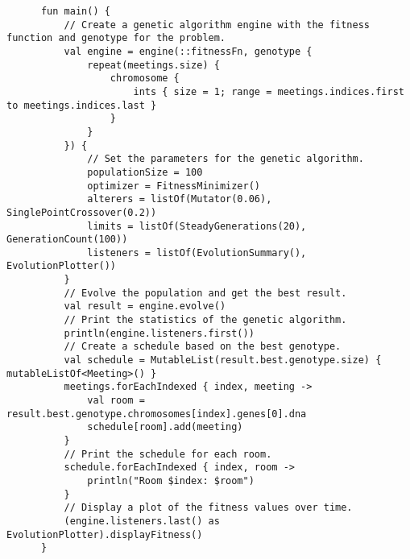 \begin{verbatim}
      fun main() {
          // Create a genetic algorithm engine with the fitness function and genotype for the problem.
          val engine = engine(::fitnessFn, genotype {
              repeat(meetings.size) {
                  chromosome {
                      ints { size = 1; range = meetings.indices.first to meetings.indices.last }
                  }
              }
          }) {
              // Set the parameters for the genetic algorithm.
              populationSize = 100
              optimizer = FitnessMinimizer()
              alterers = listOf(Mutator(0.06), SinglePointCrossover(0.2))
              limits = listOf(SteadyGenerations(20), GenerationCount(100))
              listeners = listOf(EvolutionSummary(), EvolutionPlotter())
          }
          // Evolve the population and get the best result.
          val result = engine.evolve()
          // Print the statistics of the genetic algorithm.
          println(engine.listeners.first())
          // Create a schedule based on the best genotype.
          val schedule = MutableList(result.best.genotype.size) { mutableListOf<Meeting>() }
          meetings.forEachIndexed { index, meeting ->
              val room = result.best.genotype.chromosomes[index].genes[0].dna
              schedule[room].add(meeting)
          }
          // Print the schedule for each room.
          schedule.forEachIndexed { index, room ->
              println("Room $index: $room")
          }
          // Display a plot of the fitness values over time.
          (engine.listeners.last() as EvolutionPlotter).displayFitness()
      }
    \end{verbatim}